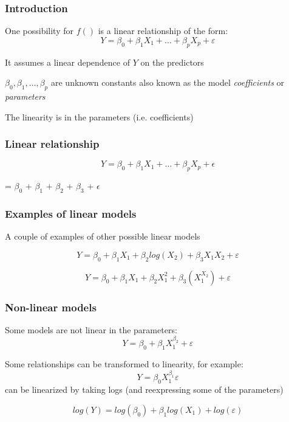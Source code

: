 \documentclass[12pt]{beamer}\usepackage[]{graphicx}\usepackage[]{color}
\begin{document}

\begin{frame}
\frametitle{Introduction}

One possibility for $f()$ is a linear relationship of the form:
{\Large
$$
Y = \beta_0 + \beta_1 X_1 + \dots + \beta_p X_p + \varepsilon
$$
}

\pause
\bi
  \item It assumes a linear dependence of $Y$ on the predictors
  \item $\beta_0, \beta_1, \dots, \beta_p$ are unknown constants
  also known as the model \textit{coefficients} or \textit{parameters}
  \item The linearity is in the parameters (i.e. coefficients)
\ei

\end{frame}


\begin{frame}
\frametitle{Linear relationship}

$$
Y = \beta_0 + \beta_1 X_1 + \dots + \beta_p X_p + \epsilon
$$

\bigskip

\begin{center}
 = $\beta_0$ + $\beta_1$  + $\beta_2$  + $\beta_3$  + $\epsilon$
\end{center}

\end{frame}


\begin{frame}
\frametitle{Examples of linear models}

A couple of examples of other possible linear models

$$
Y = \beta_0 + \beta_1 X_1 + \beta_2 log(X_2) + \beta_3 X_1 X_2 + \varepsilon 
$$

$$
Y = \beta_0 + \beta_1 X_1 + \beta_2 X_{1}^{2} + \beta_3 (X_{1}^{X_2}) + \varepsilon 
$$

\end{frame}


\begin{frame}
\frametitle{Non-linear models}

Some models are not linear in the parameters:
$$
Y = \beta_0 + \beta_1 X_{1}^{\beta_2} + \varepsilon 
$$

Some relationships can be transformed to linearity, for example:
$$
Y = \beta_0 X_{1}^{\beta_1} \varepsilon
$$
can be linearized by taking logs (and reexpressing some of the parameters)

$$
log(Y) = log(\beta_0) + \beta_1 log(X_1) + log(\varepsilon)
$$

\end{frame}
\end{document}

